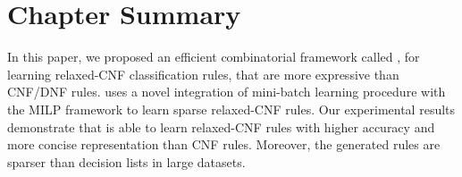 \section{Chapter Summary}
\label{interpretability_crr_sec:conclusion}

In this paper, we proposed an efficient combinatorial framework called {\crr}, for learning relaxed-CNF  classification rules, that are  more expressive  than CNF/DNF rules.  {\crr}  uses a novel integration of mini-batch learning procedure with the MILP framework to learn sparse relaxed-CNF rules. Our experimental results demonstrate that {\crr} is able to learn relaxed-CNF  rules with higher accuracy and more concise representation than CNF rules. Moreover, the generated rules are sparser than decision lists in large datasets. 